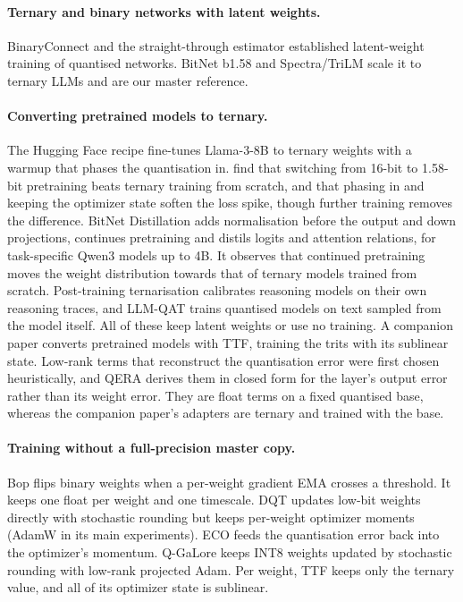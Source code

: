 \documentclass[10pt,twocolumn]{article}
\begin{document}
\paragraph{Ternary and binary networks with latent weights.} BinaryConnect \citep{courbariaux2015binaryconnect} and the
straight-through estimator \citep{bengio2013estimating} established latent-weight training of quantised networks. BitNet
b1.58 \citep{ma2024era} and Spectra/TriLM \citep{kaushal2025spectra} scale it to ternary LLMs and are our master
reference.

\paragraph{Converting pretrained models to ternary.} The Hugging Face recipe \citep{mekkouri2024bitnet} fine-tunes
Llama-3-8B to ternary weights with a warmup that phases the quantisation in. \citet{nielsen2025continual} find that
switching from 16-bit to 1.58-bit pretraining beats ternary training from scratch, and that phasing in and keeping the
optimizer state soften the loss spike, though further training removes the difference. BitNet Distillation
\citep{wu2025bitdistill} adds normalisation before the output and down projections, continues pretraining and distils
logits and attention relations, for task-specific Qwen3 models up to 4B. It observes that continued pretraining moves the
weight distribution towards that of ternary models trained from scratch. Post-training ternarisation \citep{wang2026ayot}
calibrates reasoning models on their own reasoning traces, and LLM-QAT \citep{liu2024llmqat} trains quantised models on
text sampled from the model itself. All of these keep latent weights or use no training. A companion paper converts
pretrained models with TTF, training the trits with its sublinear state. Low-rank terms that reconstruct the
quantisation error were first chosen heuristically, and QERA \citep{zhang2025qera} derives them in closed form for the
layer's output error rather than its weight error. They are float terms on a fixed quantised base, whereas the
companion paper's adapters are ternary and trained with the base.

\paragraph{Training without a full-precision master copy.} Bop \citep{helwegen2019latent} flips binary weights when a
per-weight gradient EMA crosses a threshold. It keeps one float per weight and one timescale. DQT \citep{zhao2025dqt}
updates low-bit weights directly with stochastic rounding but keeps per-weight optimizer moments (AdamW in its main
experiments). ECO \citep{nikdan2026eco}
feeds the quantisation error back into the optimizer's momentum. Q-GaLore \citep{zhang2024qgalore} keeps INT8 weights
updated by stochastic rounding with low-rank projected Adam. Per weight, TTF keeps only the ternary value, and all of its
optimizer state is sublinear.
\end{document}

